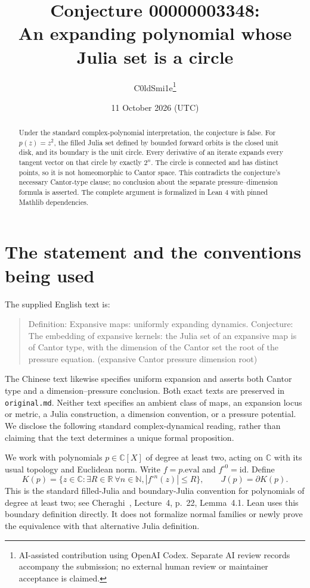 \documentclass[11pt]{article}
\title{Conjecture 00000003348:\\An expanding polynomial whose Julia set is a circle}
\author{C0ldSmi1e\thanks{AI-assisted contribution using OpenAI Codex. Separate AI review records accompany the submission; no external human review or maintainer acceptance is claimed.}}
\date{11 October 2026 (UTC)}
\newcommand{\C}{\mathbb C}
\newcommand{\R}{\mathbb R}
\newcommand{\N}{\mathbb N}
\newcommand{\J}{J}
\newcommand{\K}{K}
\begin{document}
\maketitle
\begin{abstract}
Under the standard complex-polynomial interpretation, the conjecture is false.
For $p(z)=z^2$, the filled Julia set defined by bounded forward orbits is the
closed unit disk, and its boundary is the unit circle. Every derivative of an
iterate expands every tangent vector on that circle by exactly $2^n$.
The circle is connected and has distinct points, so it is not homeomorphic to
Cantor space. This contradicts the conjecture's necessary Cantor-type clause;
no conclusion about the separate pressure--dimension formula is asserted.
The complete argument is formalized in Lean 4 with pinned Mathlib dependencies.
\end{abstract}

\section{The statement and the conventions being used}
The supplied English text is:
\begin{quote}
Definition: Expansive maps: uniformly expanding dynamics. Conjecture: The
embedding of expansive kernels: the Julia set of an expansive map is of Cantor
type, with the dimension of the Cantor set the root of the pressure equation.
(expansive Cantor pressure dimension root)
\end{quote}
The Chinese text likewise specifies uniform expansion and asserts both
Cantor type and a dimension--pressure conclusion. Both exact texts are
preserved in \texttt{original.md}. Neither text specifies an ambient class of
maps, an expansion locus or metric, a Julia construction, a dimension
convention, or a pressure potential. We disclose the following standard
complex-dynamical reading, rather than claiming that the text determines a
unique formal proposition.

We work with polynomials $p\in\C[X]$ of degree at least two, acting on $\C$
with its usual topology and Euclidean norm. Write $f=p.\mathrm{eval}$ and
$f^{\circ 0}=\mathrm{id}$. Define
\[
 \K(p)=\{z\in\C:\exists R\in\R\ \forall n\in\N,
                   |f^{\circ n}(z)|\le R\},\qquad
 \J(p)=\partial\K(p).
\]
This is the standard filled-Julia and boundary-Julia convention for
polynomials of degree at least two; see Cheraghi~\cite{cheraghi}, Lecture~4,
p.~22, Lemma~4.1. Lean uses this boundary definition directly. It does not
formalize normal families or newly prove the equivalence with that alternative
Julia definition.
\end{document}
